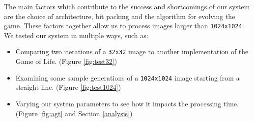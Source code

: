 \documentclass{article}
\begin{document}
    The main factors which contribute to the success and shortcomings of our system are the choice of architecture, bit packing and the algorithm for evolving the game. These factors together allow us to process images larger than \verb|1024x1024|. We tested our system in multiple ways, such as:
    
    \begin{itemize}
        \setlength\itemsep{-0.2\baselineskip}
        \item Comparing two iterations of a \verb|32x32| image to another implementation of the Game of Life. (Figure \ref{fig:test32})
        \item Examining some sample generations of a \verb|1024x1024| image starting from a straight line. (Figure \ref{fig:test1024})
        \item Varying our system parameters to see how it impacts the processing time. (Figure \ref{fig:agt} and Section \ref{analysis})
    \end{itemize}
    
\end{document}
